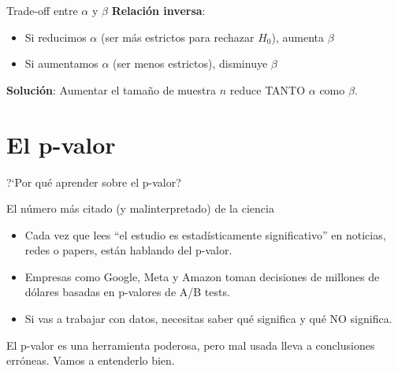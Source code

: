 \documentclass[aspectratio=169, 11pt]{beamer}
\begin{document}
\begin{frame}{Trade-off entre $\alpha$ y $\beta$}
\textbf{Relación inversa}:
\begin{itemize}
  \item Si reducimos $\alpha$ (ser más estrictos para rechazar $H_0$), aumenta $\beta$
  \item Si aumentamos $\alpha$ (ser menos estrictos), disminuye $\beta$
\end{itemize}

\vspace{0.3cm}
\begin{center}
\end{center}

\vspace{0.3cm}
\textbf{Solución}: Aumentar el tamaño de muestra $n$ reduce TANTO $\alpha$ como $\beta$.
\end{frame}

\section{El p-valor}

\begin{frame}{?`Por qu\'e aprender sobre el p-valor?}
\small
\begin{exampleblock}{El n\'umero m\'as citado (y malinterpretado) de la ciencia}
\begin{itemize}\setlength{\itemsep}{2pt}
  \item Cada vez que lees ``el estudio es estad\'isticamente significativo'' en noticias, redes o papers, est\'an hablando del p-valor.
  \item Empresas como Google, Meta y Amazon toman decisiones de millones de d\'olares basadas en p-valores de A/B tests.
  \item Si vas a trabajar con datos, \alert{necesitas} saber qu\'e significa y qu\'e NO significa.
\end{itemize}
\end{exampleblock}

\vspace{0.2cm}
El p-valor es una herramienta poderosa, pero mal usada lleva a conclusiones err\'oneas. Vamos a entenderlo bien.
\end{frame}
\end{document}
